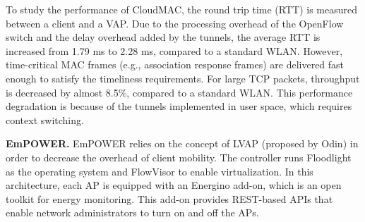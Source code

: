 


To study the performance of CloudMAC, the round trip time (RTT) is measured between a client and a VAP. 
Due to the processing overhead of the OpenFlow switch and the delay overhead added by the tunnels, the average RTT is increased from 1.79 ms to 2.28 ms, compared to a standard WLAN.  
However, time-critical MAC frames (e.g., association response frames) are delivered fast enough to satisfy the timeliness requirements.
For large TCP packets, throughput is decreased by almost 8.5$\%$, compared to a standard WLAN. 
This performance degradation is because of the tunnels implemented in user space, which requires context switching. 



\textbf{EmPOWER.}
\label{EMPOWERarch}
EmPOWER \cite{EmPOWER} relies on the concept of LVAP (proposed by Odin) in order to decrease the overhead of client mobility.
The controller runs Floodlight as the operating system and FlowVisor to enable virtualization.
In this architecture, each AP is equipped with an Energino \cite{Energino} add-on, which is an open toolkit for energy monitoring.
This add-on provides REST-based APIs that enable network administrators to turn on and off the APs.





